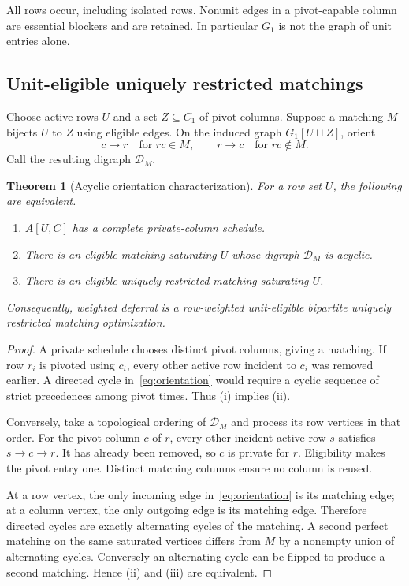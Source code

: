 \documentclass[11pt]{article}
\newtheorem{theorem}{Theorem}[section]
\theoremstyle{definition}\newtheorem{definition}[theorem]{Definition}
\theoremstyle{remark}\newtheorem{remark}[theorem]{Remark}
\begin{document}
All rows occur, including isolated rows. Nonunit edges in a pivot-capable column are essential blockers and are retained. In particular $G_1$ is not the graph of unit entries alone.

\subsection{Unit-eligible uniquely restricted matchings}
Choose active rows $U$ and a set $Z\subseteq C_1$ of pivot columns. Suppose a matching $M$ bijects $U$ to $Z$ using eligible edges. On the induced graph $G_1[U\sqcup Z]$, orient
\begin{equation}
 c\longrightarrow r\quad\text{for }rc\in M,
 \qquad
 r\longrightarrow c\quad\text{for }rc\notin M.
 \label{eq:orientation}
\end{equation}
Call the resulting digraph $\mathcal D_M$.

\begin{theorem}[Acyclic orientation characterization]
\label{thm:orientation}
For a row set $U$, the following are equivalent.
\begin{enumerate}[label=(\roman*)]
\item $A[U,C]$ has a complete private-column schedule.
\item There is an eligible matching saturating $U$ whose digraph $\mathcal D_M$ is acyclic.
\item There is an eligible uniquely restricted matching saturating $U$.
\end{enumerate}
Consequently, weighted deferral is a row-weighted unit-eligible bipartite uniquely restricted matching optimization.
\end{theorem}
\begin{proof}
A private schedule chooses distinct pivot columns, giving a matching. If row $r_i$ is pivoted using $c_i$, every other active row incident to $c_i$ was removed earlier. A directed cycle in~\eqref{eq:orientation} would require a cyclic sequence of strict precedences among pivot times. Thus (i) implies (ii).

Conversely, take a topological ordering of $\mathcal D_M$ and process its row vertices in that order. For the pivot column $c$ of $r$, every other incident active row $s$ satisfies $s\to c\to r$. It has already been removed, so $c$ is private for $r$. Eligibility makes the pivot entry one. Distinct matching columns ensure no column is reused.

At a row vertex, the only incoming edge in~\eqref{eq:orientation} is its matching edge; at a column vertex, the only outgoing edge is its matching edge. Therefore directed cycles are exactly alternating cycles of the matching. A second perfect matching on the same saturated vertices differs from $M$ by a nonempty union of alternating cycles. Conversely an alternating cycle can be flipped to produce a second matching. Hence (ii) and (iii) are equivalent.
\end{proof}
\end{document}
